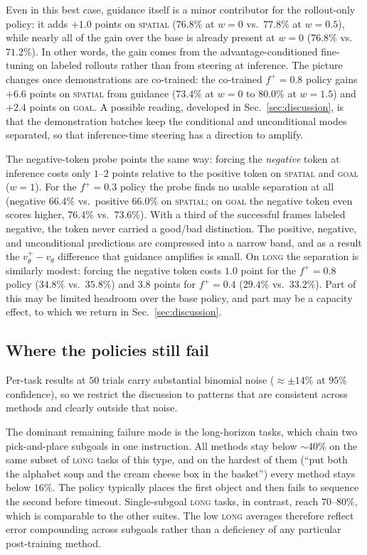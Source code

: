 \documentclass[conference]{IEEEtran}
\newcommand{\pf}{\ensuremath{f^{+}}}   %
\begin{document}
Even in this best case, guidance itself is a minor contributor for the rollout-only
policy: it adds $+1.0$ points on \textsc{spatial} ($76.8\%$ at $w{=}0$ vs.\ $77.8\%$ at
$w{=}0.5$), while nearly all of the gain over the base is already present at $w{=}0$
($76.8\%$ vs.\ $71.2\%$). In other words, the gain comes from the advantage-conditioned
fine-tuning on labeled rollouts rather than from steering at inference. The picture
changes once demonstrations are co-trained: the co-trained $\pf{=}0.8$ policy gains
$+6.6$ points on \textsc{spatial} from guidance ($73.4\%$ at $w{=}0$ to $80.0\%$ at
$w{=}1.5$) and $+2.4$ points on \textsc{goal}. A possible reading, developed in
Sec.~\ref{sec:discussion}, is that the demonstration batches keep the conditional and
unconditional modes separated, so that inference-time steering has a direction to amplify.

The negative-token probe points the same way: forcing the \emph{negative} token at
inference costs only $1$--$2$ points relative to the positive token on \textsc{spatial}
and \textsc{goal} ($w{=}1$). For the $\pf{=}0.3$ policy the probe finds no usable
separation at all (negative $66.4\%$ vs.\ positive $66.0\%$ on \textsc{spatial}; on
\textsc{goal} the negative token even scores higher, $76.4\%$ vs.\ $73.6\%$). With a third
of the successful frames labeled negative, the token never carried a good/bad distinction.
The positive, negative, and unconditional predictions are compressed into a narrow band,
and as a result the $v_\theta^{+}\!-\!v_\theta$ difference that guidance amplifies is
small. On \textsc{long} the separation is similarly modest: forcing the negative token
costs $1.0$ point for the $\pf{=}0.8$ policy ($34.8\%$ vs.\ $35.8\%$) and $3.8$ points for
$\pf{=}0.4$ ($29.4\%$ vs.\ $33.2\%$). Part of this may be limited headroom over the base
policy, and part may be a capacity effect, to which we return in
Sec.~\ref{sec:discussion}.

\subsection{Where the policies still fail}\label{sec:failure}
Per-task results at $50$ trials carry substantial binomial noise ($\approx\pm14\%$ at
$95\%$ confidence), so we restrict the discussion to patterns that are consistent across
methods and clearly outside that noise.

The dominant remaining failure mode is the long-horizon tasks, which chain two
pick-and-place subgoals in one instruction. All methods stay below $\sim40\%$ on the same
subset of \textsc{long} tasks of this type, and on the hardest of them (``put both the
alphabet soup and the cream cheese box in the basket'') every method stays below $16\%$.
The policy typically places the first object and then fails to sequence the second before
timeout. Single-subgoal \textsc{long} tasks, in contrast, reach $70$--$80\%$, which is
comparable to the other suites. The low \textsc{long} averages therefore reflect error
compounding across subgoals rather than a deficiency of any particular post-training
method.
\end{document}
